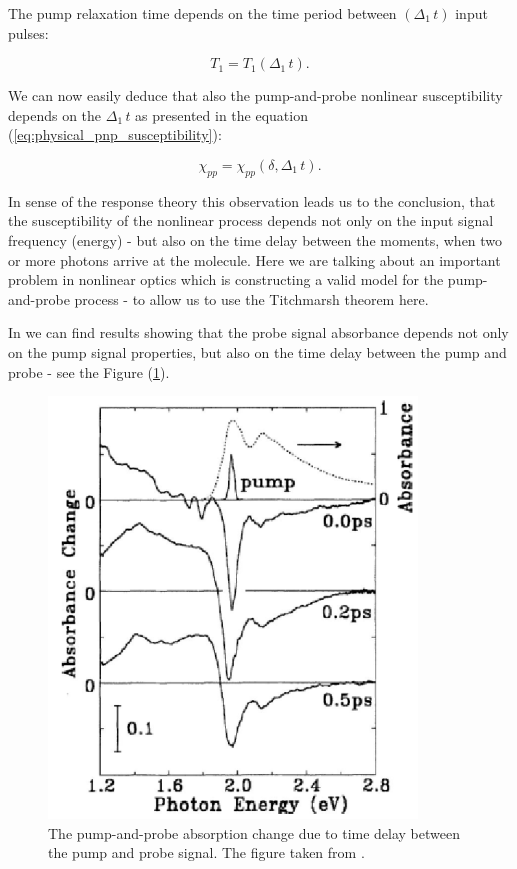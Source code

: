 \documentclass[12pt,twoside,a4paper]{article}
\numberwithin{equation}{subsection}
\numberwithin{figure}{subsection}
\begin{document}
The pump relaxation time depends on the time period between $( \Delta_1 \, t)$ input pulses:

\begin{equation} \label{eq:physical_periodtime}
   T_{1} =  T_{1} ( \Delta_1 \, t).
\end{equation}

We can now easily deduce that also the pump-and-probe nonlinear susceptibility depends on the $\Delta_1 \, t $ as presented in the equation
(\ref{eq:physical_pnp_susceptibility}):

\begin{equation} \label{eq:physical_pnp_susceptibility}
  \chi_{pp} = \chi_{pp} (\delta , \Delta_1 \, t).
\end{equation} 

In sense of the response theory this observation leads us to the conclusion, that the susceptibility of the nonlinear process depends not
only on the input signal frequency (energy) - but also on the time delay between the moments, when two or more photons arrive at
the molecule. Here we are talking about an important problem in nonlinear optics which is constructing a valid model for the pump-and-probe
process - to allow us to use the Titchmarsh theorem here. 

In \cite{christodoulides_nonlinear} we can find results showing that the probe signal absorbance depends not only on the pump
signal properties, but also on the time delay between the pump and probe - see the Figure (\ref{physical_fig:pnp_absorption}).

\begin{figure} 
  \includegraphics{img/pnp_abs.png}
  \caption{The pump-and-probe absorption change due to time delay between the pump and probe signal.
  The figure taken from \cite{christodoulides_nonlinear}. \label{physical_fig:pnp_absorption} }
\end{figure}
\end{document}
